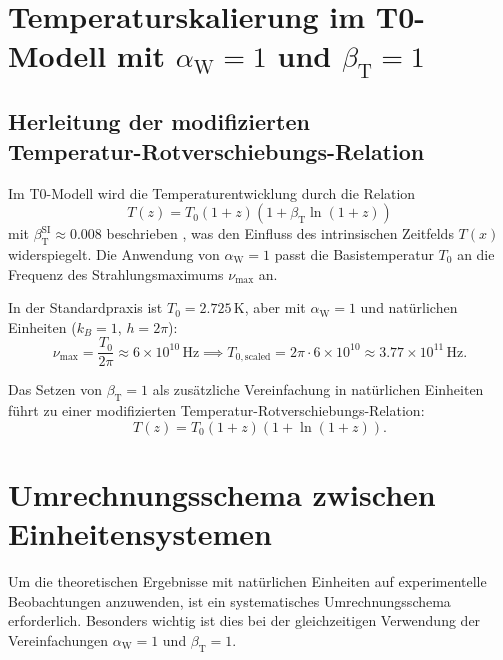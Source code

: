 \documentclass[12pt,a4paper]{article}
\newcommand{\Tfield}{T(x)}
\newcommand{\betaT}{\beta_{\text{T}}}
\newcommand{\alphaW}{\alpha_{\text{W}}}
\begin{document}
	\section{Temperaturskalierung im T0-Modell mit \(\alphaW = 1\) und \(\betaT = 1\)}
	
	\subsection{Herleitung der modifizierten\\ Temperatur-Rotverschiebungs-Relation}
	
	Im T0-Modell wird die Temperaturentwicklung durch die Relation
	\begin{equation}
		T(z) = T_0 (1 + z) (1 + \betaT \ln(1 + z))
	\end{equation}
	mit \(\betaT^{\text{SI}} \approx 0.008\) beschrieben \cite{pascher_messdifferenzen_2025}, was den Einfluss des intrinsischen Zeitfelds \(\Tfield\) widerspiegelt. Die Anwendung von \(\alphaW = 1\) passt die Basistemperatur \(T_0\) an die Frequenz des Strahlungsmaximums \(\nu_{\text{max}}\) an.
	
	In der Standardpraxis ist \(T_0 = 2.725 \, \text{K}\), aber mit \(\alphaW = 1\) und natürlichen Einheiten (\(k_B = 1\), \(h = 2\pi\)):
	\[
	\nu_{\text{max}} = \frac{T_0}{2\pi} \approx 6 \times 10^{10} \, \text{Hz} \implies T_{0,\text{scaled}} = 2\pi \cdot 6 \times 10^{10} \approx 3.77 \times 10^{11} \, \text{Hz}.
	\]
	
	Das Setzen von \(\betaT = 1\) als zusätzliche Vereinfachung in natürlichen Einheiten führt zu einer modifizierten Temperatur-Rotverschiebungs-Relation:
	\[
	T(z) = T_0 (1 + z) (1 + \ln(1 + z)).
	\]
	
	\section{Umrechnungsschema zwischen Einheitensystemen}
	
	Um die theoretischen Ergebnisse mit natürlichen Einheiten auf experimentelle Beobachtungen anzuwenden, ist ein systematisches Umrechnungsschema erforderlich. Besonders wichtig ist dies bei der gleichzeitigen Verwendung der Vereinfachungen \(\alphaW = 1\) und \(\betaT = 1\).
	
\end{document}
